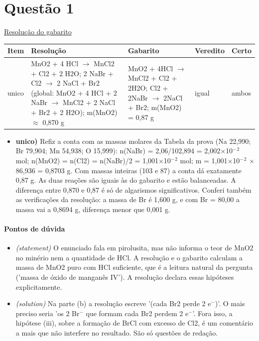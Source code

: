 \documentclass{article}%
\begin{document}
\section*{Questão 1}%
\href{https://poliedroresolve.sistemapoliedro.com.br/vestibulares/ime/2027/ime-2-fase-dia-3-28-10-2026-2-fase-dia-3/dissertativa-1-quimica-2-fase-dia-3-ime-2027}{Resolução do gabarito}\par\smallskip%
\begin{longtable}{@{}p{} p{} p{} p{} p{}@{}}\toprule Item & Resolução & Gabarito & Veredito & Certo \\ \midrule
unico & MnO2 + 4 HCl $\to$ MnCl2 + Cl2 + 2 H2O; 2 NaBr + Cl2 $\to$ 2 NaCl + Br2 (global: MnO2 + 4 HCl + 2 NaBr $\to$ MnCl2 + 2 NaCl + Br2 + 2 H2O); m(MnO2) $\approx$ 0,870 g & MnO2 + 4HCl $\to$ MnCl2 + Cl2 + 2H2O; Cl2 + 2NaBr $\to$ 2NaCl + Br2; m(MnO2) = 0,87 g & igual & ambos \\
\bottomrule\end{longtable}%
\begin{itemize}%
\item%
\textbf{unico)} Refiz a conta com as massas molares da Tabela da prova (Na 22,990; Br 79,904; Mn 54,938; O 15,999): n(NaBr) = 2,06/102,894 = 2,002$\times$10$^{-}$$^2$ mol; n(MnO2) = n(Cl2) = n(NaBr)/2 = 1,001$\times$10$^{-}$$^2$ mol; m = 1,001$\times$10$^{-}$$^2$ $\times$ 86,936 = 0,8703 g. Com massas inteiras (103 e 87) a conta dá exatamente 0,87 g. As duas reações são iguais às do gabarito e estão balanceadas. A diferença entre 0,870 e 0,87 é só de algarismos significativos. Conferi também as verificações da resolução: a massa de Br é 1,600 g, e com Br = 80,00 a massa vai a 0,8694 g, diferença menor que 0,001 g.%
\end{itemize}%
\paragraph{Pontos de dúvida}%
\begin{itemize}%
\item%
\textit{(statement)} O enunciado fala em pirolusita, mas não informa o teor de MnO2 no minério nem a quantidade de HCl. A resolução e o gabarito calculam a massa de MnO2 puro com HCl suficiente, que é a leitura natural da pergunta ('massa de óxido de manganês IV'). A resolução declara essas hipóteses explicitamente.%
\item%
\textit{(solution)} Na parte (b) a resolução escreve '(cada Br2 perde 2 e$^{-}$)'. O mais preciso seria 'os 2 Br$^{-}$ que formam cada Br2 perdem 2 e$^{-}$'. Fora isso, a hipótese (iii), sobre a formação de BrCl com excesso de Cl2, é um comentário a mais que não interfere no resultado. São só questões de redação.%
\end{itemize}%
\end{document}
